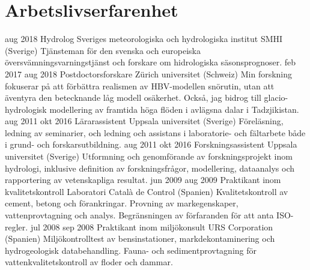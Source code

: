 \ifswedish
  \section{Arbetslivserfarenhet}
    \position
      {aug 2018 \textemdash{} }
      {Hydrolog}
      {Sveriges meteorologiska och hydrologiska institut SMHI (Sverige)}
      {Tjänsteman för den svenska och europeiska översvämningsvarningstjänst och forskare om hidrologiska säsonsprognoser.}
    \position
      {feb 2017 \textemdash{} aug 2018}
      {Postdoctorsforskare}
      {Zürich universitet (Schweiz)}
      {Min forskning fokuserar på att förbättra realismen av HBV-modellen snörutin, utan att äventyra den betecknande låg modell osäkerhet. Också, jag bidrog till glacio-hydrologisk modellering av framtida höga flöden i avlägsna dalar i Tadzjikistan.}
    \position
      {aug 2011 \textemdash{} okt 2016}
      {Lärarassistent}
      {Uppsala universitet (Sverige)}
      {Föreläsning, ledning av seminarier, och ledning och assistans i laboratorie- och fältarbete både i grund- och forskarsutbildning.}
    \position
      {aug 2011 \textemdash{} okt 2016}
      {Forskningsassistent}
      {Uppsala universitet (Sverige)}
      {Utformning och genomförande av forskningsprojekt inom hydrologi, inklusive definition av forskningsfrågor, modellering, dataanalys och rapportering av vetenskapliga resultat.}
    \position
      {jun 2009 \textemdash{} aug 2009}
      {Praktikant inom kvalitetskontroll}
      {Laboratori Català de Control (Spanien)}
      {Kvalitetskontroll av cement, betong och förankringar. Provning av markegenskaper, vattenprovtagning och analys. Begränsningen av förfaranden för att anta ISO-regler.}
    \position
      {jul 2008 \textemdash{} sep 2008}
      {Praktikant inom miljökonsult}
      {URS Corporation (Spanien)}
      {Miljökontrolltest av bensinstationer, markdekontaminering och hydrogeologisk databehandling. Fauna- och sedimentprovtagning för vattenkvalitetskontroll av floder och dammar.}
\else
